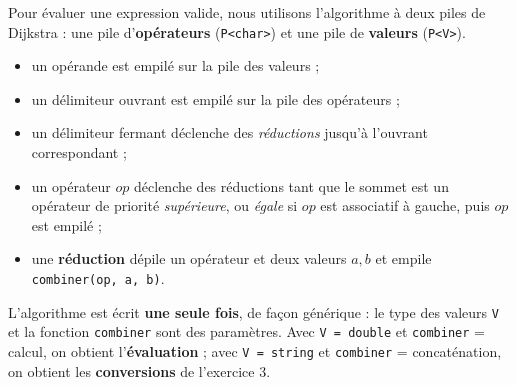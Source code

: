 \documentclass[11pt,a4paper]{article}
\newcommand{\code}[1]{\texttt{#1}}
\begin{document}
Pour évaluer une expression valide, nous utilisons l'algorithme à deux piles
de Dijkstra : une pile d'\textbf{opérateurs} (\code{P<char>}) et une pile de
\textbf{valeurs} (\code{P<V>}).
\begin{itemize}
  \item un opérande est empilé sur la pile des valeurs ;
  \item un délimiteur ouvrant est empilé sur la pile des opérateurs ;
  \item un délimiteur fermant déclenche des \emph{réductions} jusqu'à
        l'ouvrant correspondant ;
  \item un opérateur $op$ déclenche des réductions tant que le sommet est
        un opérateur de priorité \emph{supérieure}, ou \emph{égale} si $op$
        est associatif à gauche, puis $op$ est empilé ;
  \item une \textbf{réduction} dépile un opérateur et deux valeurs $a, b$
        et empile \code{combiner(op, a, b)}.
\end{itemize}

L'algorithme est écrit \textbf{une seule fois}, de façon générique : le type
des valeurs \code{V} et la fonction \code{combiner} sont des paramètres.
Avec \code{V = double} et \code{combiner} = calcul, on obtient
l'\textbf{évaluation} ; avec \code{V = string} et \code{combiner} =
concaténation, on obtient les \textbf{conversions} de l'exercice 3.
\end{document}
